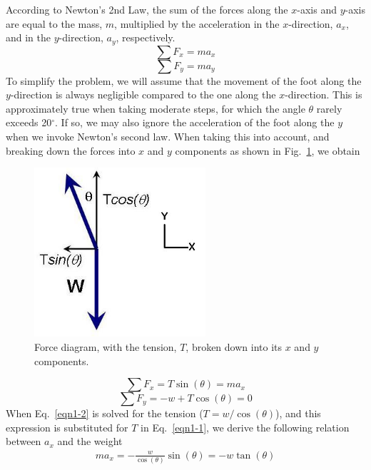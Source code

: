 According to Newton’s 2nd Law, the sum of the forces along the $x$-axis and $y$-axis are equal to the mass, $m$, multiplied by the acceleration in the $x$-direction, $a_x$, and in the $y$-direction, $a_y$, respectively.
$$\sum F_x = ma_x$$
$$\sum F_y = ma_y$$
To simplify the problem, we will assume that the movement of the foot along the $y$-direction is always negligible compared to the one along the $x$-direction. This is approximately true when taking moderate steps, for which the angle $\theta$ rarely exceeds 20$^{\circ}$. If so, we may also ignore the acceleration of the foot along the $y$ when we invoke Newton’s second law. When taking this into account, and breaking down the forces into $x$ and $y$ components as shown in Fig.~\ref{Fig1-3}, we obtain 
\begin{figure}[htb]
	\centering
	\includegraphics[width=2.5in]{./figures/Topic1/Figure1-3.jpg}
	\caption{Force diagram, with the tension, $T$, broken down into its $x$ and $y$ components.}
	\label{Fig1-3}
\end{figure} 

\begin{equation}\label{eqn1-1}
\sum F_x = T \sin\left(\theta\right) = ma_x
\end{equation}
\begin{equation}\label{eqn1-2}
\sum F_y = -w + T \cos\left(\theta\right) = 0
\end{equation}
When Eq.~\ref{eqn1-2} is solved for the tension ($T = w/ \cos(\theta)$), and this expression is substituted for $T$ in Eq.~\ref{eqn1-1}, we derive the following relation between $a_x$ and the weight 
\begin{eqnarray}\label{eqn1-3}
ma_x = -\frac{w}{\cos\left(\theta\right)} \sin\left(\theta\right) = -w \tan\left(\theta\right)
\end{eqnarray}


